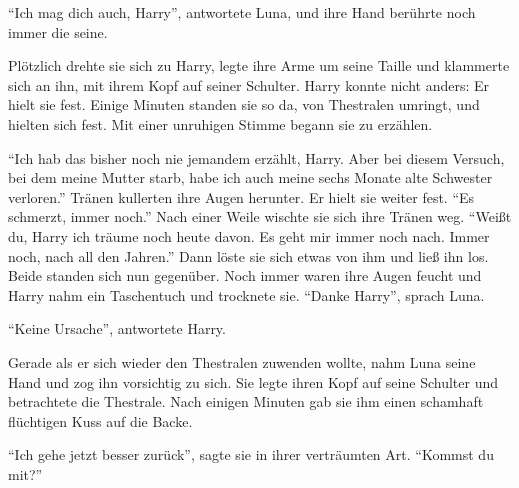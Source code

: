 \enquote{Ich mag dich auch, Harry}, antwortete Luna, und ihre Hand berührte noch immer die seine.

Plötzlich drehte sie sich zu Harry, legte ihre Arme um seine Taille und klammerte sich an ihn, mit ihrem Kopf auf seiner Schulter. Harry konnte nicht anders: Er hielt sie fest. Einige Minuten standen sie so da, von Thestralen umringt, und hielten sich fest. Mit einer unruhigen Stimme begann sie zu erzählen.

\enquote{Ich hab das bisher noch nie jemandem erzählt, Harry. Aber bei diesem Versuch, bei dem meine Mutter starb, habe ich auch meine sechs Monate alte Schwester verloren.} Tränen kullerten ihre Augen herunter. Er hielt sie weiter fest. \enquote{Es schmerzt, immer noch.} Nach einer Weile wischte sie sich ihre Tränen weg. \enquote{Weißt du, Harry \gst ich träume noch heute davon. Es geht mir immer noch nach. Immer noch, nach all den Jahren.} Dann löste sie sich etwas von ihm und ließ ihn los. Beide standen sich nun gegenüber. Noch immer waren ihre Augen feucht und Harry nahm ein Taschentuch und trocknete sie. \enquote{Danke Harry}, sprach Luna.

\enquote{Keine Ursache}, antwortete Harry.

Gerade als er sich wieder den Thestralen zuwenden wollte, nahm Luna seine Hand und zog ihn vorsichtig zu sich. Sie legte ihren Kopf auf seine Schulter und betrachtete die Thestrale. Nach einigen Minuten gab sie ihm einen schamhaft flüchtigen Kuss auf die Backe.

\enquote{Ich gehe jetzt besser zurück}, sagte sie in ihrer verträumten Art. \enquote{Kommst du mit?}

